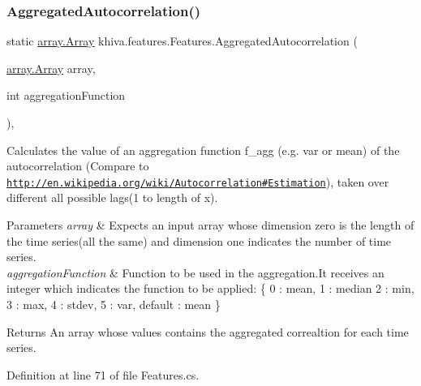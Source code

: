 \subsubsection{\texorpdfstring{Aggregated\+Autocorrelation()}{AggregatedAutocorrelation()}}
{\footnotesize\ttfamily static \mbox{\hyperlink{classkhiva_1_1array_1_1_array}{array.\+Array}} khiva.\+features.\+Features.\+Aggregated\+Autocorrelation (\begin{DoxyParamCaption}\item[{\mbox{\hyperlink{classkhiva_1_1array_1_1_array}{array.\+Array}}}]{array,  }\item[{int}]{aggregation\+Function }\end{DoxyParamCaption})\hspace{0.3cm}{\ttfamily [inline]}, {\ttfamily [static]}}



Calculates the value of an aggregation function f\+\_\+agg (e.\+g. var or mean) of the autocorrelation (Compare to \href{http://en.wikipedia.org/wiki/Autocorrelation#Estimation}{\tt http\+://en.\+wikipedia.\+org/wiki/\+Autocorrelation\#\+Estimation}), taken over different all possible lags(1 to length of x).


\begin{DoxyParams}{Parameters}
{\em array} & Expects an input array whose dimension zero is the length of the time series(all the same) and dimension one indicates the number of time series.\\
\hline
{\em aggregation\+Function} & Function to be used in the aggregation.\+It receives an integer which indicates the function to be applied\+: \{ 0 \+: mean, 1 \+: median 2 \+: min, 3 \+: max, 4 \+: stdev, 5 \+: var, default \+: mean \}\\
\hline
\end{DoxyParams}
\begin{DoxyReturn}{Returns}
An array whose values contains the aggregated correaltion for each time series.
\end{DoxyReturn}


Definition at line 71 of file Features.\+cs.

\mbox{\label{classkhiva_1_1features_1_1_features_aa9e69b44583edf0ecad24b02910c228f}} 
